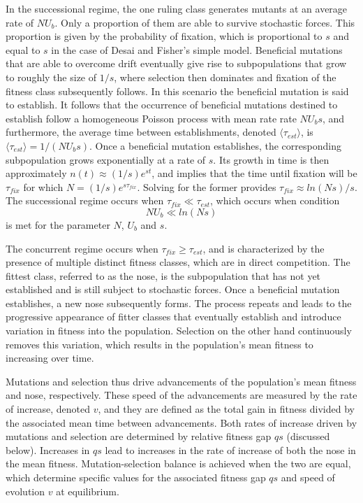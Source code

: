 \documentclass[12pt]{article}
\begin{document}
In the successional regime, the one ruling class generates mutants at an average rate of $N U_b$.  Only a proportion of them are able to survive stochastic forces.  This proportion is given by the probability of fixation, which is proportional to $s$ and equal to $s$ in the case of Desai and Fisher's simple model.  Beneficial mutations that are able to overcome drift eventually give rise to subpopulations that grow to roughly the size of $1/s$, where selection then dominates and fixation of the fitness class subsequently follows.  In this scenario the beneficial mutation is said to establish.  It follows that the occurrence of beneficial mutations destined to establish follow a homogeneous Poisson process with mean rate rate $NU_b s$, and furthermore, the average time between establishments, denoted $\langle \tau_{est} \rangle$, is $\langle \tau_{est} \rangle = 1/(N U_b s)$.  Once a beneficial mutation establishes, the corresponding subpopulation grows exponentially at a rate of $s$.  Its growth in time is then approximately $n(t)\approx (1/s) e^{st}$, and implies that the time until fixation will be $\tau_{fix}$ for which $N =(1/s)e^{s \tau_{fix}}$.  Solving for the former provides $\tau_{fix} \approx ln(Ns)/s$.  The successional regime occurs when $\tau_{fix} \ll \tau_{est}$, which occurs when condition
\[ N U_b \ll ln(Ns) \] 
is met for the parameter $N$, $U_b$ and $s$. 

The concurrent regime occurs when $\tau_{fix} \ge \tau_{est}$, and is characterized by the presence of multiple distinct fitness classes, which are in direct competition.  The fittest class, referred to as the nose, is the subpopulation that has not yet established and is still subject to stochastic forces.  Once a beneficial mutation establishes, a new nose subsequently forms.  The process repeats and leads to the progressive appearance of fitter classes that eventually establish and introduce variation in fitness into the population.  Selection on the other hand continuously removes this variation, which results in the population's mean fitness to increasing over time.  

Mutations and selection thus drive advancements of the population's mean fitness and nose, respectively.  These speed of the advancements are measured by the rate of increase, denoted $v$, and they are defined as the total gain in fitness divided by the associated mean time between advancements.  Both rates of increase driven by mutations and selection are determined by relative fitness gap $qs$ (discussed below).  Increases in $qs$ lead to increases in the rate of increase of both the nose in the mean fitness.  Mutation-selection balance is achieved when the two are equal, which determine specific values for the associated fitness gap $qs$ and speed of evolution $v$ at equilibrium. 
\end{document}
